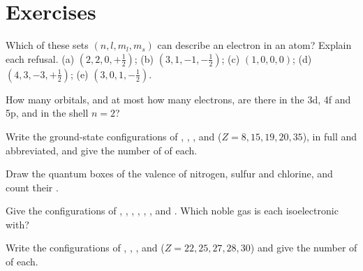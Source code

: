 \section{Exercises}

\begin{exercise}[$\star$]\label{exo:b1:quantum-numbers:1}
Which of these sets $(n, l, m_l, m_s)$ can describe an electron in an
atom? Explain each refusal.
(a) $(2, 2, 0, +\tfrac12)$; (b) $(3, 1, -1, -\tfrac12)$;
(c) $(1, 0, 0, 0)$; (d) $(4, 3, -3, +\tfrac12)$; (e) $(3, 0, 1, -\tfrac12)$.
\end{exercise}

\begin{exercise}[$\star$]\label{exo:b1:quantum-numbers:2}
How many orbitals, and at most how many electrons, are there in the
 3d, 4f and 5p, and in the shell $n = 2$?
\end{exercise}

\begin{exercise}[$\star$]\label{exo:b1:quantum-numbers:3}
Write the ground-state configurations of , , , 
and  ($Z = 8, 15, 19, 20, 35$), in full and abbreviated, and give
the number of  of each.
\end{exercise}

\begin{exercise}[$\star$]\label{exo:b1:quantum-numbers:4}
Draw the quantum boxes of the valence  of nitrogen, sulfur and
chlorine, and count their .
\end{exercise}

\begin{exercise}[$\star\star$]\label{exo:b1:quantum-numbers:5}
Give the configurations of , , , ,
, ,  and . Which noble gas is
each isoelectronic with?
\end{exercise}

\begin{exercise}[$\star\star$]\label{exo:b1:quantum-numbers:6}
Write the configurations of , , ,
 and  ($Z = 22, 25, 27, 28, 30$) and give the
number of  of each.
\end{exercise}

